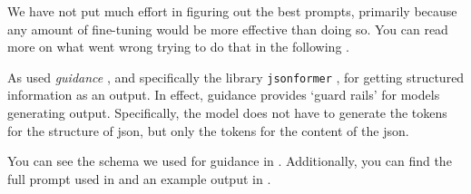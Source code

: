 We have not put much effort in figuring out the best prompts, primarily because any amount of fine-tuning would be more effective than doing so. You can read more on what went wrong trying to do that in the following .

As used \textit{guidance} \cite{guidance_2023}, and specifically the library \texttt{jsonformer} \cite{1rgs_2023}, for getting structured information as an output.
In effect, guidance provides `guard rails' for models generating output.
Specifically, the model does not have to generate the tokens for the structure of json, but only the tokens for the content of the json.


You can see the schema we used for guidance in . Additionally, you can find the full prompt used in  and an example output in .





